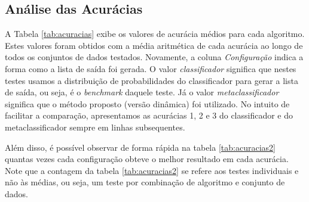 \subsection{Análise das Acurácias}

A Tabela \ref{tab:acuracias} exibe os valores de acurácia médios para cada algoritmo. 
Estes valores foram obtidos com a média aritmética de cada acurácia ao longo de todos os conjuntos de dados testados.
Novamente, a coluna \textit{Configuração} indica a forma como a lista de saída foi gerada. 
O valor \textit{classificador} significa que nestes testes usamos a distribuição de probabilidades do classificador para gerar a lista de saída, ou seja, é o \textit{benchmark} daquele teste.
Já o valor \textit{metaclassificador} significa que o método proposto (versão dinâmica) foi utilizado.
No intuito de facilitar a comparação, apresentamos as acurácias 1, 2 e 3 do classificador e do metaclassificador sempre em linhas subsequentes.

Além disso, é possível observar de forma rápida na tabela \ref{tab:acuracias2} quantas vezes cada configuração obteve o melhor resultado em cada acurácia.
Note que a contagem da tabela \ref{tab:acuracias2} se refere aos testes individuais e não às médias, ou seja, um teste por combinação de algoritmo e conjunto de dados.


